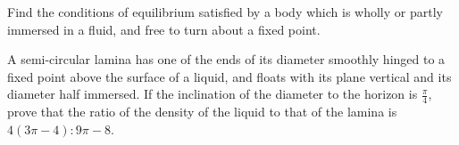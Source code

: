 Find the conditions of equilibrium satisfied
by a body which is wholly or partly immersed
in a fluid, and free to turn about a fixed point.

A semi-circular lamina has one of the ends of its 
diameter smoothly hinged to a fixed point above the 
surface of a liquid, and floats with its plane vertical
and its diameter half immersed. If the inclination of the 
diameter to the horizon is $\frac{\pi}{4}$, prove
that the ratio of the density of the liquid to that of the 
lamina is $4 ( 3 \pi - 4 ) : 9 \pi - 8$.  

